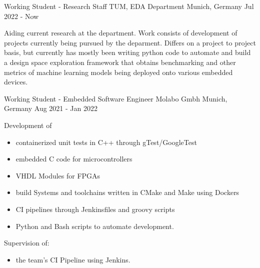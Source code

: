 
\begin{cventries}
  \cventry
    {Working Student - Research Staff} %
    {TUM, EDA Department} %
    {Munich, Germany} %
    {Jul 2022 - Now} %
    {
      \begin{cvitems} %
          Aiding current research at the department. Work consists of development of projects currently being
          pursued by the deparment. Differs on a project to project basis, but currently has mostly been
          writing python code to automate and build a design space exploration framework that obtains
          benchmarking and other metrics of machine learning models being deployed onto various embedded devices.
      \end{cvitems}
    }
  \cventry
    {Working Student - Embedded Software Engineer} %
    {Molabo Gmbh} %
    {Munich, Germany} %
    {Aug 2021 - Jan 2022} %
    {
      \begin{cvitems} %
        \item {Development of}
            \begin{itemize}
                \item {containerized unit tests in C++ through gTest/GoogleTest}
                \item {embedded C code for microcontrollers}
                \item {VHDL Modules for FPGAs}
                \item {build Systems and toolchains written in CMake and Make using Dockers}
                \item {CI pipelines through Jenkinsfiles and groovy scripts}
                \item {Python and Bash scripts to automate development.}
            \end{itemize}
        \item {Supervision of:}
          \begin{itemize}
            \item {the team's CI Pipeline using Jenkins.}
          \end{itemize}
      \end{cvitems}
    }



\end{cventries}
